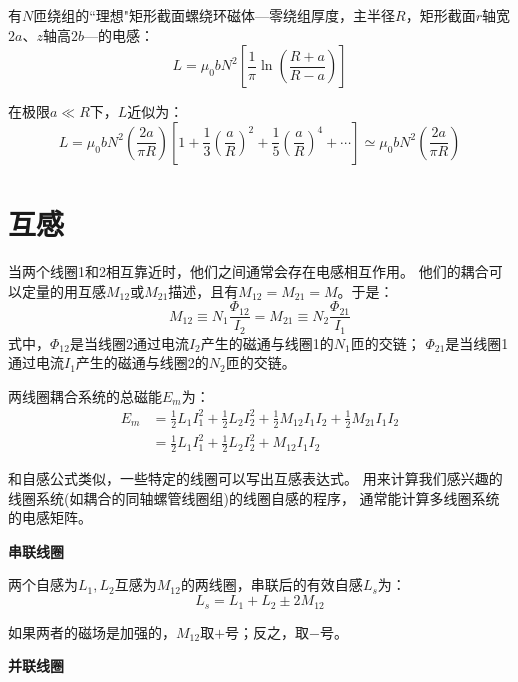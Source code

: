 有$N$匝绕组的``理想"矩形截面螺绕环磁体---零绕组厚度，主半径$R$，矩形截面$r$轴宽$2a$、$z$轴高$2b$---的电感：
 \begin{equation}
L=\mu_0bN^2\left[\frac{1}{\pi}\ln\left(\frac{R+a}{R-a}\right)\right]%
\end{equation}

在极限$a\ll R$下，$L$近似为：
\begin{equation*}
L=\mu_0bN^2\left(\frac{2a}{\pi R}\right)\left[1+\frac{1}{3}\left(\frac{a}{R}\right)^2+\frac{1}{5}\left(\frac{a}{R}\right)^4+\cdots\right]\simeq\mu_0bN^2\left(\frac{2a}{\pi R}\right) \tag{3.90b}%
\end{equation*}



\section{互感}
当两个线圈1和2相互靠近时，他们之间通常会存在电感相互作用。
他们的耦合可以定量的用互感$M_{12}$或$M_{21}$描述，且有$M_{12}=M_{21}=M$。于是：
\begin{equation}
M_{12}\equiv N_1\frac{\Phi_{12}}{I_2}=M_{21}\equiv N_2\frac{\Phi_{21}}{I_1}%
\end{equation}
式中，$\Phi_{12}$是当线圈2通过电流$I_2$产生的磁通与线圈1的$N_1$匝的交链；
$\Phi_{21}$是当线圈1通过电流$I_1$产生的磁通与线圈2的$N_2$匝的交链。

两线圈耦合系统的总磁能$E_m$为：
\begin{equation}
\begin{split}
E_m&=\frac{1}{2}L_1I_1^2+\frac{1}{2}L_2I_2^2+\frac{1}{2}M_{12}I_1I_2+\frac{1}{2}M_{21}I_1I_2\\
&= \frac{1}{2}L_1I_1^2+\frac{1}{2}L_2I_2^2+M_{12}I_1I_2%
\end{split}
\end{equation}

和自感公式类似，一些特定的线圈可以写出互感表达式。
用来计算我们感兴趣的线圈系统(如耦合的同轴螺管线圈组)的线圈自感的程序，
通常能计算多线圈系统的电感矩阵。

\textbf{串联线圈} 
  
  两个自感为$L_1,L_2$互感为$M_{12}$的两线圈，串联后的有效自感$L_s$为：
  \begin{equation}
   L_s=L_1+L_2 \pm 2M_{12}%
  \end{equation}

如果两者的磁场是加强的，$M_{12}$取$+$号；反之，取$−$号。

\textbf{并联线圈} 

